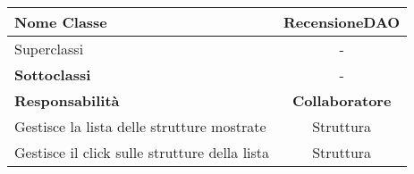 
\setcounter{table}{0}
\begin{table}[H]
    \centering
    \begin{tabular}{||   l  ||  c   ||}
        \hline
        \rowcolor{Gray}
        \textbf{Nome Classe} & RecensioneDAO\\
        \hline
        Superclassi  &  - \\
        \hline
        \textbf{Sottoclassi} & - \\
        \hline
         \textbf{Responsabilità} & \textbf{Collaboratore} \\
         \hline
          Gestisce la lista delle strutture mostrate & Struttura \\
         \hline
          Gestisce il click sulle strutture della lista & Struttura \\
         \hline
    \end{tabular}
\end{table}
